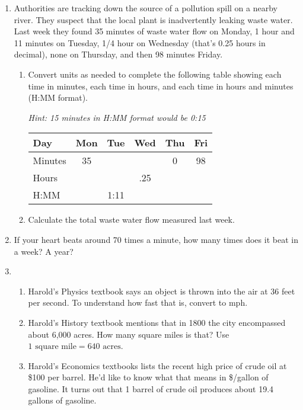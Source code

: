 \begin{enumerate}
\item Authorities are tracking down the source of a pollution spill on a nearby river.  They suspect that the local plant is inadvertently leaking waste water.  Last week they found 35 minutes of waste water flow on Monday, 1 hour and 11 minutes on Tuesday, 1/4 hour on Wednesday (that's 0.25 hours in decimal), none on Thursday, and then 98 minutes Friday.
\begin{enumerate}
\item Convert units as needed to complete the following table showing each time in minutes, each time in hours, and each time in hours and minutes (H:MM format). 

\emph{Hint:  15 minutes in H:MM format would be 0:15}
\begin{center}
\begin{tabular} {|l |c|c|c |c|c|} \hline
Day & Mon & Tue & Wed & Thu & Fri \\ \hline
Minutes & 35 & && 0 & 98 \\ \hline
Hours & \hspace{.5in}~ &\hspace{.5in}~ &.25&\hspace{.5in}~ &\hspace{.5in}~  \\ \hline
H:MM & & 1:11 & \hspace{.5in}~   & &  \\ \hline
\end{tabular}
\end{center}
\item Calculate the total waste water flow measured last week. 
\end{enumerate}

\item If your heart beats around 70 times a minute, how many times does it beat in a week?  A year?

\item \begin{enumerate}
\item Harold's Physics textbook says an object is thrown into the air at 36 feet per second.  To understand how fast that is, convert to mph.
\item Harold's History textbook mentions that in 1800 the city encompassed about 6,000 acres.  How many square miles is that?  Use $1 \text{ square mile} = 640 \text{ acres}$.
\item Harold's Economics textbooks lists the recent high price of crude oil at \$100 per barrel.  He'd like to know what that means in \$/gallon of gasoline.  It turns out that 1 barrel of crude oil produces about 19.4 gallons of gasoline. 
\end{enumerate}




\end{enumerate}
